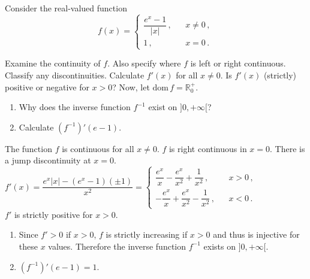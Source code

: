 \begin{Exercise} %
Consider the real-valued function
$$
f(x)=\left\{
\begin{array}{rcl}
\dfrac{e^x-1}{|x|}\,,&&x\neq0\,,\\
1\,,&&x=0\,.
\end{array}\right.
$$

\Question Examine the continuity of $f$. Also specify where $f$ is left or right continuous.
\Question Classify any discontinuities.
\Question Calculate $f'(x)$ for all $x\neq0$. Is $f'(x)$ (strictly) positive or negative for $x>0$?
\Question Now, let $\text{dom}\,f=\mathbb{R}^+_0$. 
    \begin{enumerate}
        \item[(i)]  Why does the inverse function $f^{-1}$ exist on $]0,+\infty[$?
        \item[(ii)]  Calculate $\left(f^{-1}\right)'(e-1)$.
    \end{enumerate}
\EndCurrentQuestion
\end{Exercise}

\begin{Answer} 
\Question The function $f$ is continuous for all $x \neq 0$. $f$ is right continuous in $x=0$.
\Question There is a jump discontinuity at $x=0$.
\Question $f'(x) = \dfrac{e^x |x| - (e^x - 1) (\pm 1)}{x^2} = \left\{
\begin{array}{rcl}
\dfrac{e^x}{x} - \dfrac{e^x}{x^2} + \dfrac{1}{x^2} \,,& & x>0\,,\\[0.4cm]
-\dfrac{e^x}{x} + \dfrac{e^x}{x^2} - \dfrac{1}{x^2} \,,& & x<0\,.
\end{array}\right.$ \\

$f'$ is strictly positive for $x>0$.

\Question  
    \begin{enumerate}
        \item[(i)] Since $f'>0$ if $x>0$, $f$ is strictly increasing if $x>0$ and thus is injective for these $x$ values. Therefore the inverse function $f^{-1}$ exists on $]0,+\infty[$.
        \item[(ii)]  $\left(f^{-1}\right)'(e-1) = 1$.
    \end{enumerate}
\end{Answer}



